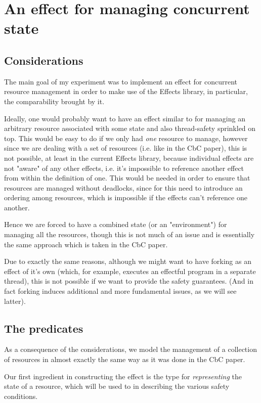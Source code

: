 \section{An effect for managing concurrent state}

\subsection{Considerations}

The main goal of my experiment was to implement an effect for
concurrent resource management in order to make use of the Effects library, in
particular, the comparability brought by it.

Ideally, one would probably want to have an effect similar to 
for managing an arbitrary resource associated with some state and also
thread-safety sprinkled on top. This would be easy to do if we only had
\emph{one} resource to manage, however since we are dealing with a set of
resources (i.e. like in the CbC paper), this is not possible, at least in the
current Effects library, because individual effects are not "aware" of any
other effects, i.e. it's impossible to reference another effect from within the
definition of one. This would be needed in order to ensure that resources are
managed without deadlocks, since for this need to introduce an ordering among
resources, which is impossible if the effects can't reference one another.

Hence we are forced to have a combined state (or an "environment") for managing
all the resources, though this is not much of an issue and is essentially the
same approach which is taken in the CbC paper.

Due to exactly the same reasons, although we might want to have forking as an
effect of it's own (which, for example, executes an effectful program in a
separate thread), this is not possible if we want to provide the safety
guarantees. (And in fact forking induces additional and more fundamental
issues, as we will see latter).


\subsection{The predicates}

As a consequence of the considerations, we model the management of a collection
of resources in almost exactly the same way as it was done in the CbC paper.

Our first ingredient in constructing the effect is the type for
\emph{representing} the state of a resource, which will be used to in
describing the various safety conditions.

